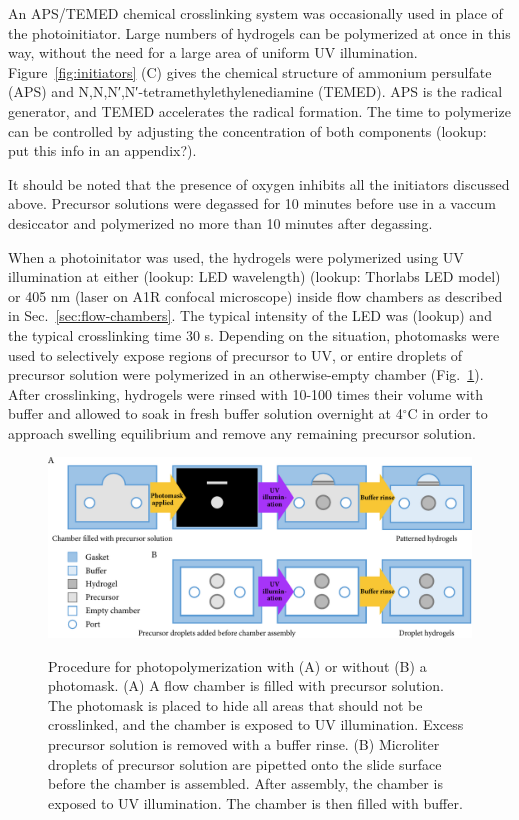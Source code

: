 An APS/TEMED chemical crosslinking system was occasionally used in place of the photoinitiator.  Large numbers of hydrogels can be polymerized at once in this way, without the need for a large area of uniform UV illumination.  Figure~\ref{fig:initiators} (C) gives the chemical structure of ammonium persulfate (APS) and N,N,N′,N′-tetramethylethylenediamine (TEMED).  APS is the radical generator, and TEMED accelerates the radical formation.  The time to polymerize can be controlled by adjusting the concentration of both components (lookup: put this info in an appendix?).

It should be noted that the presence of oxygen inhibits all the initiators discussed above.  Precursor solutions were degassed for 10 minutes before use in a vaccum desiccator and polymerized no more than 10 minutes after degassing.

When a photoinitator was used, the hydrogels were polymerized using UV illumination at either (lookup: LED wavelength) (lookup: Thorlabs LED model) or 405 nm (laser on A1R confocal microscope) inside flow chambers as described in Sec.~\ref{sec:flow-chambers}.  The typical intensity of the LED was (lookup) and the typical crosslinking time 30 s.  Depending on the situation, photomasks were used to selectively expose regions of precursor to UV, or entire droplets of precursor solution were polymerized in an otherwise-empty chamber (Fig.~\ref{fig:photomask}).  After crosslinking, hydrogels were rinsed with 10-100 times their volume with buffer and allowed to soak in fresh buffer solution overnight at 4$^\circ$C in order to approach swelling equilibrium and remove any remaining precursor solution.

\begin{figure}
\caption{Procedure for photopolymerization with (A) or without (B) a photomask. (A) A flow chamber is filled with precursor solution.  The photomask is placed to hide all areas that should not be crosslinked, and the chamber is exposed to UV illumination.  Excess precursor solution is removed with a buffer rinse. (B) Microliter droplets of precursor solution are pipetted onto the slide surface before the chamber is assembled.  After assembly, the chamber is exposed to UV illumination.  The chamber is then filled with buffer.}
\centering
\includegraphics[width=\textwidth]{figs/ch03/photomask}
\label{fig:photomask}
\end{figure}

